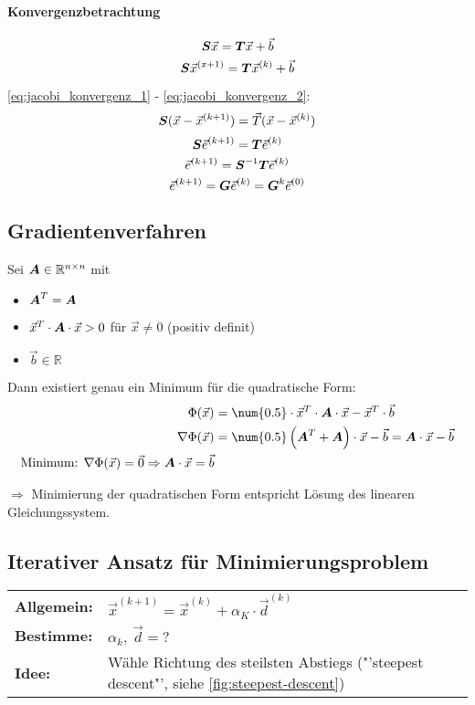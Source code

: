\paragraph{Konvergenzbetrachtung}
\begin{equation}
	\boldsymbol {S} \vec{x} = \boldsymbol {T} \vec{x} + \vec{b}
	\label{eq:jacobi_konvergenz_1}
\end{equation}
\begin{equation}
	\boldsymbol {S} \vec{x}^{(x + 1)} = \boldsymbol {T} \vec{x}^{(k)} + \vec{b}
	\label{eq:jacobi_konvergenz_2}
\end{equation}

\ref{eq:jacobi_konvergenz_1} - \ref{eq:jacobi_konvergenz_2}:
\[\boldsymbol {S} (\vec{x} - \vec{x}^{(k + 1)}) = \vec{T} (\vec{x} - \vec{x}^{(k)})\]
\[\boldsymbol {S} \vec{e}^{(k + 1)} = \boldsymbol {T} \vec{e}^{(k)}\]
\[\vec{e}^{(k + 1)} = \boldsymbol {S}^{-1} \boldsymbol {T} \vec{e}^{(k)}\]
\[\vec{e}^{(k + 1)} = \boldsymbol {G} \vec{e}^{(k)} = \boldsymbol {G}^k \vec{e}^{(0)}\]

\subsection{Gradientenverfahren}
Sei $ \boldsymbol {A} \in \mathbb{R}^{n\times n} $ mit
\begin{itemize}
	\item $\boldsymbol {A}^T = \boldsymbol {A}$
	\item $\vec{x}^T \cdot \boldsymbol {A} \cdot \vec{x} > 0$ für $\vec{x} \neq 0$ (positiv definit)
	\item $\vec{b} \in \mathbb{R}$
\end{itemize}

Dann existiert genau ein Minimum für die quadratische Form:
\begin{align}
	\Phi(\vec{x}) &= \num{0.5} \cdot \vec{x}^T \cdot \ma{A} \cdot \vec{x} - \vec{x}^T \cdot \vec{b}\\
	\nabla \Phi(\vec{x}) &= \num{0.5} \left( \ma{A}^T + \ma{A} \right) \cdot \vec{x} - \vec{b} = \ma{A} \cdot \vec{x} - \vec{b}\\
	\text{Minimum: } \nabla \Phi(\vec{x}) = \vec{0} \Rightarrow \ma{A} \cdot \vec{x} = \vec{b}
\end{align}

$\Rightarrow$ Minimierung der quadratischen Form entspricht Lösung des linearen Gleichungssystem.

\subsection{Iterativer Ansatz für Minimierungsproblem}
\begin{tabular}{ll}
	\textbf{Allgemein:} & $\vec{x}^{(k+1)} = \vec{x}^{(k)} + \alpha_K \cdot \vec{d}^{(k)}$\\
	\textbf{Bestimme:} & $\alpha_k,\ \vec{d} = ?$\\
	\textbf{Idee:} & Wähle Richtung des steilsten Abstiegs ("'steepest descent"', siehe \autoref{fig:steepest-descent})\\
\end{tabular}

